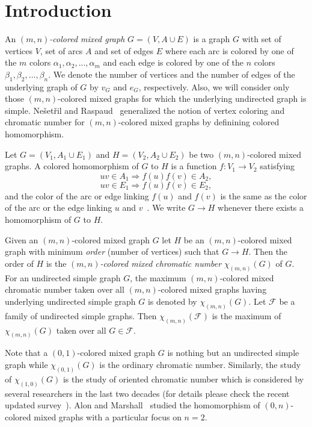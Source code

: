 \documentclass[11pt]{article}
\begin{document}
\section{Introduction}
An \textit{$(m,n)$-colored mixed graph} $G = (V, A \cup E)$ is a graph $G$ with set of vertices $V$, set of arcs $A$ and set of edges $E$ where each arc is 
 colored by one of the $m$ colors $\alpha_1, \alpha_2, ..., \alpha_m$ and each edge is  colored by one of the $n$ colors $\beta_1, \beta_2, ..., \beta_n$. We denote  the number of vertices and the number of edges of the underlying graph of $G$ by $v_{G}$  and $e_{G}$, respectively.
Also, we will consider only those 
$(m,n)$-colored mixed graphs for which the underlying undirected graph is simple.
Ne\v{s}et\v{r}il and Raspaud~\cite{raspaud_and_nesetril} generalized the notion of vertex coloring and chromatic number 
 for $(m,n)$-colored mixed graphs
 by definining colored homomorphism. 

  
Let $G = (V_1, A_1 \cup E_1)$ and $H = (V_2, A_2 \cup E_2)$
be two $(m,n)$-colored mixed graphs. 
A colored homomorphism of $G$ to $H$ is a function $f : V_1 \rightarrow V_2$ satisfying
$$uv \in A_1 \Rightarrow f(u)f(v) \in A_2,$$ 
$$uv \in E_1 \Rightarrow f(u)f(v) \in E_2,$$
and the color of the arc or  edge linking $f(u)$ and $f(v)$ is the same as the color of the arc or the edge linking $u$ and $v$~\cite{raspaud_and_nesetril}.
  We write $ G \rightarrow  H$ whenever there exists a 
 homomorphism of $ G$ to $ H$.


Given an $(m,n)$-colored mixed graph $G$ let $H$ be an $(m,n)$-colored mixed graph with minimum \textit{order} (number of vertices) such that $G \rightarrow H$. 
Then the order of $H$ is the \textit{$(m,n)$-colored mixed chromatic number} $\chi_{(m,n)}(G)$ of $G$.
For an undirected simple graph $G$, the maximum $(m,n)$-colored mixed chromatic number taken over all $(m, n)$-colored mixed
graphs having underlying undirected simple graph $G$ is denoted by  $\chi_{(m,n)}(G)$.
Let $\mathcal{F}$ be a family of undirected simple graphs. 
Then  $\chi_{(m,n)}(\mathcal{F})$ is the maximum of $\chi_{(m,n)}(G)$ 
taken over all $G \in \mathcal{F}$.




Note that a $(0,1)$-colored mixed graph $G$  is nothing but an undirected simple graph while  
$\chi_{(0,1)}(G)$ is the ordinary chromatic number. 
Similarly, the study of $\chi_{(1,0)}(G)$ 
is  the study of oriented chromatic number which is considered by several researchers in the last two decades (for details please check the recent updated survey~\cite{sopena_updated_survey}).
Alon and Marshall~\cite{Marshall-edgecoloring}  studied the homomorphism of $(0,n)$-colored mixed graphs with a particular focus on $n=2$. 
\end{document}
